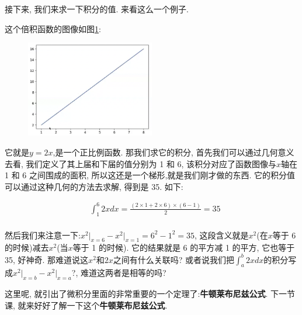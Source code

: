 接下来, 我们来求一下积分的值. 来看这么一个例子. 

这个倍积函数的图像如图\ref{fig:img13_13}:

\begin{figure}[ht]
  \centering
  \includegraphics[width=0.5\textwidth]{asset/20230903200439.png}
  \caption{}
  \label{fig:img13_13}
\end{figure}

它就是$y=2x$,是一个正比例函数. 那我们求它的积分, 首先我们可以通过几何意义去看, 我们定义了其上届和下届的值分别为 1 和 6, 该积分对应了函数图像与$x$轴在 1 和 6 之间围成的面积, 所以这还是一个梯形,就是我们刚才做的东西. 它的积分值可以通过这种几何的方法去求解, 得到是 35. 如下:

\begin{align*}
& \int_1^6 2xdx = \frac{(2 \times 1 + 2 \times 6)\times(6-1)}{2} = 35 \\
\end{align*}

然后我们来注意一下:$x^2\vert _{x=6}-x^2 \vert _{x=1}=6^2 - 1^2 = 35$, 这段含义就是$x^2$(在$x$等于 6 的时候)减去$x^2$(当$x$等于 1 的时候). 它的结果就是 6 的平方减 1 的平方, 它也等于 35, 好神奇. 那难道说这$x^2$和$2x$之间有什么关联吗? 或者说我们把$\int_a^b2xdx$的积分写成$x^2\vert_{x=b}-x^2 \vert_{x=a}$?, 难道这两者是相等的吗? 

这里呢, 就引出了微积分里面的非常重要的一个定理了:\textbf{牛顿莱布尼兹公式}. 下一节课, 就来好好了解一下这个\textbf{牛顿莱布尼兹公式}. 